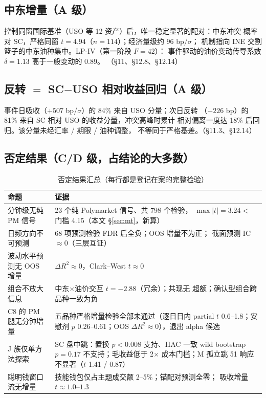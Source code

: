 \documentclass[11pt, a4paper]{ctexart}
\begin{document}
\subsection{中东增量（A 级）}

控制同窗国际基准（USO 等 12 资产）后，唯一稳定显著的配对：中东冲突
概率对 SC，严格同窗 $t=4.94$（$n=114$）；经济量级约 $96$ bp/$\sigma$；
机制指向 INE 交割篮子的中东油种集中。LP-IV（第一阶段 $F=42$）：
事件驱动的油价变动传导系数 $\delta=1.13$ 高于一般变动的 $0.89$。
（§11、§12.8、§12.14）

\subsection{反转 $=$ SC$-$USO 相对收益回归（A 级）}

事件日吸收（$+507$ bp/$\sigma$）的 84\% 来自 USO 分量；次日反转
（$-226$ bp）的 81\% 来自 SC 相对 USO 的收益分量，冲突高峰时累计
相对偏离一度达 18\% 后回归。该分量未经汇率 / 期限 / 油种调整，
不等同于严格基差。（§11.3、§12.14）

\subsection{否定结果（C/D 级，占结论的大多数）}

\begin{table}[h!]\centering\small
\caption{否定结果汇总（每行都是登记在案的完整检验）}
\begin{tabular}{p{5.0cm}p{8.4cm}}
\toprule
命题 & 证据 \\
\midrule
分钟级无纯 PM 信号 & 23 个纯 Polymarket 信号、共 798 个检验，
  $\max|t|=3.24 <$ 门槛 4.15（本文 \S\ref{sec:mt}，新算） \\
日频方向不可预测 & 68 项预测检验 FDR 后全负；OOS 增量不为正；
  截面预测 IC $\approx 0$（三层互证） \\
波动水平预测无 OOS 增量 & $\Delta R^2\approx0$，Clark--West
  $t\approx0$ \\
组合不放大信息 & 中东$\times$油价交互 $t=-2.88$（冗余）；共现无
  超额；确认型组合跨品种一致为负 \\
C8 的 PM 腿无分钟增量 & 五品种严格增量检验全部未通过（逐日日内
  partial $t$ 0.6--1.8；安慰剂 $p$ 0.26--0.61；OOS
  $\Delta R^2\approx0$），退出 alpha 候选 \\
J 族仅单方法探索 & SC 盘中跳：置换 $p<0.008$ 支持、HAC 一致 wild
  bootstrap $p=0.17$ 不支持；毛收益低于 2$\times$ 成本门槛；M 孤立跳
  51 响应不显著（$t$ 1.41 / 0.87） \\
聪明钱窗口流无增量 & 技能钱包仅占主题成交额 2--5\%；锚配对预测全零；
  吸收增量 $t\approx1.0$--$1.3$ \\
\bottomrule
\end{tabular}
\end{table}
\end{document}
